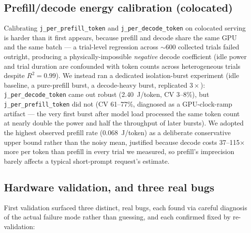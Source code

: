 \documentclass[sigconf,review,anonymous]{acmart}
\begin{document}
\subsection{Prefill/decode energy calibration (colocated)}
\label{sec:coloc-calib}

Calibrating \texttt{j\_per\_prefill\_token} and \texttt{j\_per\_decode\_token} on colocated
serving is harder than it first appears, because prefill and decode share the same GPU and
the same batch --- a trial-level regression across ${\sim}600$ collected trials failed
outright, producing a physically-impossible \emph{negative} decode coefficient (idle power
and trial duration are confounded with token counts across heterogeneous trials despite
$R^2{=}0.99$). We instead ran a dedicated isolation-burst experiment (idle baseline, a
pure-prefill burst, a decode-heavy burst, replicated $3\times$): \texttt{j\_per\_decode\_token}
came out robust (2.40~J/token, CV 3--8\%), but \texttt{j\_per\_prefill\_token} did not (CV
61--77\%, diagnosed as a GPU-clock-ramp artifact --- the very first burst after model load
processed the same token count at nearly double the power and half the throughput of later
bursts). We adopted the highest observed prefill rate (0.068~J/token) as a deliberate
conservative upper bound rather than the noisy mean, justified because decode costs
37--115$\times$ more per token than prefill in every trial we measured, so prefill's
imprecision barely affects a typical short-prompt request's estimate.

\subsection{Hardware validation, and three real bugs}
\label{sec:bugs}

First validation surfaced three distinct, real bugs, each found via careful diagnosis of the
actual failure mode rather than guessing, and each confirmed fixed by re-validation:
\end{document}
